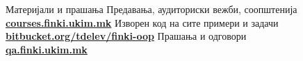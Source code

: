 \begin{frame}{Материјали и прашања}{}
    Предавања, аудиториски вежби, соопштенија\\
    \href{http://courses.finki.ukim.mk/}{\textbf{courses.finki.ukim.mk}}
    \vfill
    Изворен код на сите примери и задачи\\
    \href{http://bitbucket.org/tdelev/finki-oop/}{\textbf{bitbucket.org/tdelev/finki-oop}}
    \vfill
    Прашања и одговори\\
    \href{http://qa.finki.ukim.mk}{\textbf{qa.finki.ukim.mk}}
\end{frame}